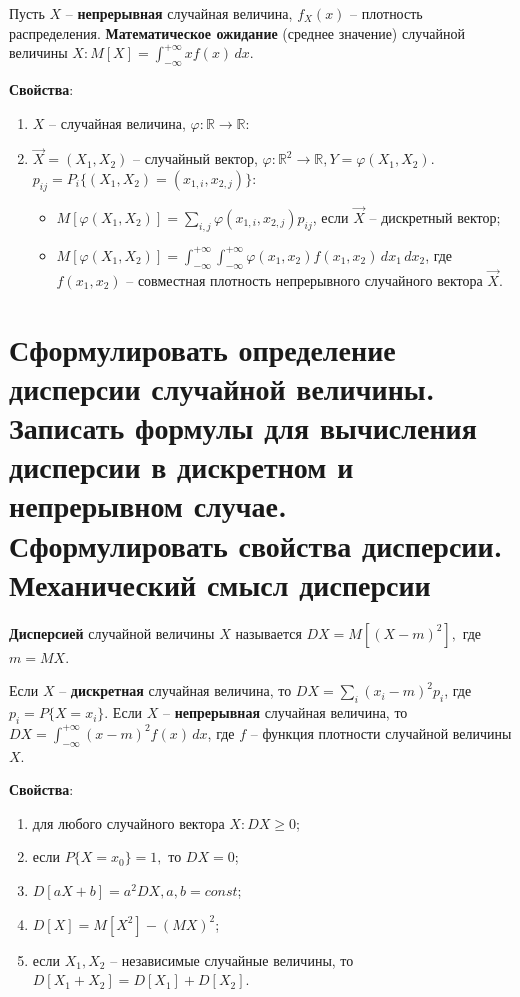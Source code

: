 Пусть $X$ -- \textbf{непрерывная} случайная величина, $f_X(x)$ -- плотность распределения. \textbf{Математическое ожидание} (среднее значение) случайной величины $X: M[X] = \int_{-\infty}^{+\infty} xf(x)\, dx$.


\textbf{Свойства}:
\begin{enumerate}
	\item $X$ -- случайная величина, $\varphi: \mathbb{R} \rightarrow \mathbb{R}$:
	\begin{itemize}
		\item $M[\varphi(X)] = \sum_{i} \varphi(x_i)p_i$, если $X$ -- дискретная случайная величина;
		\item}$M[\varphi(X)] = \int_{-\infty}^{+\infty} \varphi(x)f(x) \, dx$, если $X$ -- непрерывная случайная величина, $f(x)$ -- плотность;
	\end{itemize}
	\item $\vec{X} = (X_1, X_2)$ -- случайный вектор, $\varphi: \mathbb{R}^2 \rightarrow \mathbb{R}, Y = \varphi(X_1, X_2)$. $p_{ij} = P_i\{(X_1, X_2) = (x_{1, i}, x_{2, j})\}$:
	\begin{itemize}
		\item $M[\varphi(X_1, X_2)] = \sum_{i, j} \varphi (x_{1, i}, x_{2, j})p_{ij}$, если $\vec{X}$ -- дискретный вектор;
		\item $M[\varphi(X_1, X_2)] = \int_{-\infty}^{+\infty} \int_{-\infty}^{+\infty} \varphi(x_1, x_2)f(x_1, x_2) \, dx_1 \, dx_2$, где $f(x_1, x_2)$ -- совместная плотность непрерывного случайного вектора $\vec{X}$.
	\end{itemize}
\end{enumerate}

\section{Сформулировать определение дисперсии случайной величины. Записать формулы для вычисления дисперсии в дискретном и непрерывном случае. Сформулировать свойства дисперсии. Механический смысл дисперсии}

\textbf{Дисперсией} случайной величины $X$ называется $DX = M[(X-m)^2],$ где $m=MX$.

Если $X$ -- \textbf{дискретная} случайная величина, то $DX = \sum_{i} (x_i - m)^2 p_i$, где $p_i = P\{X=x_i\}$. Если  $X$ -- \textbf{непрерывная} случайная величина, то $DX = \int_{-\infty}^{+\infty} (x-m)^2f(x) \, dx$, где $f$ -- функция плотности случайной величины $X$.

\textbf{Свойства}:
\begin{enumerate}
	\item для любого случайного вектора $X: DX \geq 0$;
	\item если $P\{X=x_0\} = 1,$ то $DX = 0$;
	\item $D[aX+b] = a^2DX,      a, b = const$;
	\item $D[X] = M[X^2] - (MX)^2$;
	\item если $X_1, X_2$ -- независимые случайные величины, то $D[X_1 + X_2] = D[X_1] + D[X_2]$.
\end{enumerate}

